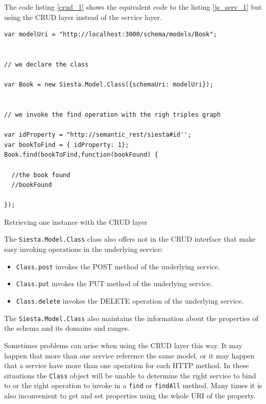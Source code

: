 The code listing \ref{crud_1} shows the equivalent code to the listing \ref{js_serv_1} but using the CRUD layer instead
of the service layer.


\begin{table}
\vspace{5 mm}
\begin{lstlisting}
var modelUri = "http://localhost:3000/schema/models/Book";


// we declare the class

var Book = new Siesta.Model.Class({schemaUri: modelUri});


// we invoke the find operation with the righ triples graph

var idProperty = "http://semantic_rest/siesta#id'';
var bookToFind = { idProperty: 1};
Book.find(bookToFind,function(bookFound) {

  //the book found
  //bookFound

});
\end{lstlisting} 
\vspace{5 mm}
\caption{Retrieving one instance with the CRUD layer}
\label{crud_1}
\end{table}


The \texttt{Siesta.Model.Class} class also offers not in the CRUD interface that make easy invoking operations in the
underlying service:

\begin{itemize}
\item \texttt{Class.post} invokes the POST method of the underlying service.
\item \texttt{Class.put} invokes the PUT method of the underlying service.
\item \texttt{Class.delete} invokes the DELETE operation of the underlying service.
\end{itemize}

The \texttt{Siesta.Model.Class} also maintains the information about the properties of the schema and its domains and ranges.

Sometimes problems can arise when using the CRUD layer this way. It may happen that more than one service reference the
same model, or it may happen that a service have more than one operation for each HTTP method. In these situations the
\texttt{Class} object will be unable to determine the right service to bind to or the right operation to invoke in a
\texttt{find} or \texttt{findAll} method. Many times it is also inconvenient to get and set properties using the whole
URI of the property. \\

